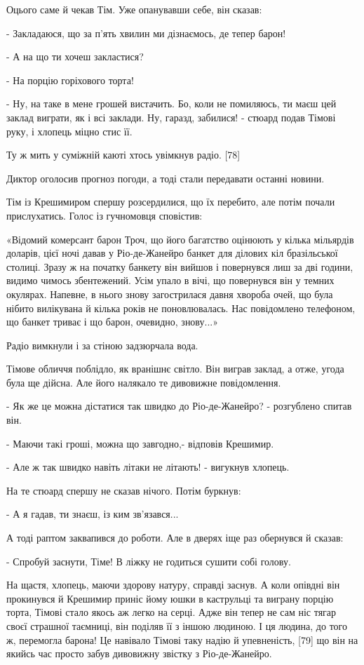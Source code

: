 Оцього саме й чекав Тім. Уже опанувавши себе, він сказав:

- Закладаюся, що за п'ять хвилин ми дізнаємось, де тепер барон!

- А на що ти хочеш закластися?

- На порцію горіхового торта!

- Ну, на таке в мене грошей вистачить. Бо, коли не помиляюсь, ти маєш цей заклад виграти, як і всі заклади. Ну, гаразд, забилися! - стюард подав Тімові руку, і хлопець міцно стис її.

Ту ж мить у суміжній каюті хтось увімкнув радіо. [78]

Диктор оголосив прогноз погоди, а тоді стали передавати останні новини.

Тім із Крешимиром спершу розсердилися, що їх перебито, але потім почали прислухатись. Голос із гучномовця сповістив:

«Відомий комерсант барон Троч, що його багатство оцінюють у кілька мільярдів доларів, цієї ночі давав у Ріо-де-Жанейро банкет для ділових кіл бразільської столиці. Зразу ж на початку банкету він вийшов і повернувся лиш за дві години, видимо чимось збентежений. Усім упало в вічі, що повернувся він у темних окулярах. Напевне, в нього знову загострилася давня хвороба очей, що була нібито вилікувана й кілька років не поновлювалась. Нас повідомлено телефоном, що банкет триває і що барон, очевидно, знову...»

Радіо вимкнули і за стіною задзюрчала вода.

Тімове обличчя поблідло, як вранішнє світло. Він виграв заклад, а отже, угода була ще дійсна. Але його налякало те дивовижне повідомлення.

- Як же це можна дістатися так швидко до Ріо-де-Жанейро? - розгублено спитав він.

- Маючи такі гроші, можна що завгодно,- відповів Крешимир.

- Але ж так швидко навіть літаки не літають! - вигукнув хлопець.

На те стюард спершу не сказав нічого. Потім буркнув:

- А я гадав, ти знаєш, із ким зв'язався...

А тоді раптом заквапився до роботи. Але в дверях іще раз обернувся й сказав:

- Спробуй заснути, Тіме! В ліжку не годиться сушити собі голову.

На щастя, хлопець, маючи здорову натуру, справді заснув. А коли опівдні він прокинувся й Крешимир приніс йому юшки в каструльці та виграну порцію торта, Тімові стало якось аж легко на серці. Адже він тепер не сам ніс тягар своєї страшної таємниці, він поділяв її з іншою людиною. І ця людина, до того ж, перемогла барона! Це навівало Тімові таку надію й упевненість, [79] що він на якийсь час просто забув дивовижну звістку з Ріо-де-Жанейро.

